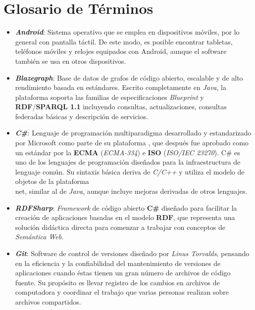\section{Glosario de Términos}
\begin{itemize}
    \item \textbf{\textit{Android}}: Sistema operativo que se emplea 
    en dispositivos móviles, por lo general con pantalla táctil. 
    De este modo, es posible encontrar tabletas, teléfonos móviles 
    y relojes equipados con Android, aunque el software también 
    se usa en otros dispositivos. 

    \item \textbf{\textit{Blazegraph}}: Base de datos de grafos de 
    código abierto, escalable y de alto rendimiento basada en 
    estándares. Escrito completamente en \emph{Java}, la plataforma soporta 
    las familias de especificaciones \emph{Blueprint} y \textbf{RDF}/\textbf{SPARQL 1.1}
    incluyendo consultas, actualizaciones, consultas federadas básicas
    y descripción de servicios. 
    
    \item \textbf{\textit{C\#}}: Lenguaje de programación multiparadigma 
    desarrollado y estandarizado por Microsoft como parte de su 
    plataforma \textbf{\net}, que después fue aprobado como un estándar por la
    \textbf{ECMA} (\emph{ECMA-334}) e \textbf{ISO} (\emph{ISO/IEC 23270}). 
    C\# es uno de los lenguajes de programación diseñados para la 
    infraestructura de lenguaje común. Su sintaxis básica deriva de 
    \emph{C/C++} y utiliza el modelo de objetos de la plataforma \\net, 
    similar al de \emph{Java}, aunque incluye mejoras derivadas de otros lenguajes.


    \item \textbf{\textit{RDFSharp}}: \emph{Framework} de código 
    abierto \textbf{C\#} diseñado para facilitar la creación de 
    aplicaciones \emph{\net} basadas en el modelo \textbf{RDF}, 
    que representa una solución didáctica directa para comenzar 
    a trabajar con conceptos de \emph{Semántica Web}.

    \item \textbf{\textit{Git}}: Software de control de versiones 
    diseñado por \emph{Linus Torvalds}, pensando en la eficiencia 
    y la confiabilidad del mantenimiento de versiones de aplicaciones 
    cuando éstas tienen un gran número de archivos de código fuente. 
    Su propósito es llevar registro de los cambios en archivos de 
    computadora y coordinar el trabajo que varias personas realizan 
    sobre archivos compartidos.


\end{itemize}
